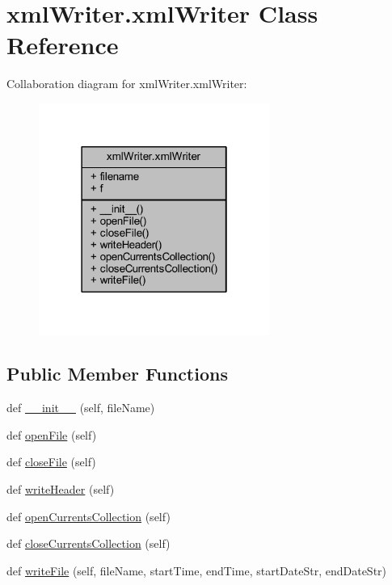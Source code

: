 \hypertarget{classxml_writer_1_1xml_writer}{}\section{xml\+Writer.\+xml\+Writer Class Reference}
\label{classxml_writer_1_1xml_writer}


Collaboration diagram for xml\+Writer.\+xml\+Writer\+:\nopagebreak
\begin{figure}[H]
\begin{center}
\leavevmode
\includegraphics[width=214pt]{classxml_writer_1_1xml_writer__coll__graph}
\end{center}
\end{figure}
\subsection*{Public Member Functions}
\begin{DoxyCompactItemize}
\item 
def \mbox{\hyperlink{classxml_writer_1_1xml_writer_a0b43f6115153b244e10d1933ee33500a}{\+\_\+\+\_\+init\+\_\+\+\_\+}} (self, file\+Name)
\item 
def \mbox{\hyperlink{classxml_writer_1_1xml_writer_a9697485604ee2a4be4fff52911fea34f}{open\+File}} (self)
\item 
def \mbox{\hyperlink{classxml_writer_1_1xml_writer_ad0738ca597cf9a517e13e50bb3be5c96}{close\+File}} (self)
\item 
def \mbox{\hyperlink{classxml_writer_1_1xml_writer_aa05ece2d045f4be023b005b42e892736}{write\+Header}} (self)
\item 
def \mbox{\hyperlink{classxml_writer_1_1xml_writer_a69b2a24925be449bc0e416e4cd2d3816}{open\+Currents\+Collection}} (self)
\item 
def \mbox{\hyperlink{classxml_writer_1_1xml_writer_adfbe5387ec461435f294e98767cff534}{close\+Currents\+Collection}} (self)
\item 
def \mbox{\hyperlink{classxml_writer_1_1xml_writer_ab686ea3fea2fc1122eb2878aaa61e6b7}{write\+File}} (self, file\+Name, start\+Time, end\+Time, start\+Date\+Str, end\+Date\+Str)
\end{DoxyCompactItemize}

